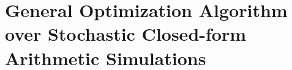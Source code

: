 \documentclass[a4paper, 12pt]{article} %
\begin{document}
%
%


\section{General Optimization Algorithm over Stochastic Closed-form Arithmetic Simulations}
\label{sec:algo}
\end{document}
